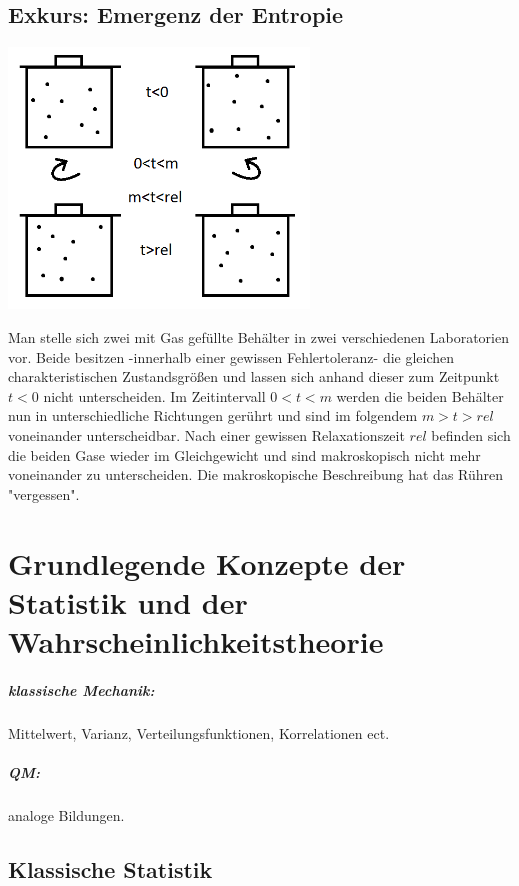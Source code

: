 	\section{Exkurs: Emergenz der Entropie}
	
	\begin{center}
		\includegraphics[width=0.6\textwidth]{Abb/Emergenz.png}
	\end{center}%
	Man stelle sich zwei mit Gas gefüllte Behälter in zwei verschiedenen Laboratorien vor. Beide besitzen -innerhalb einer gewissen Fehler\-toleranz- die gleichen charakteristischen Zustandsgrößen und lassen sich anhand dieser zum Zeitpunkt $t<0$ nicht unterscheiden. Im Zeitintervall $0<t<m$ werden die beiden Behälter nun in unterschiedliche Richtungen gerührt und sind im folgendem $m>t>rel$ voneinander unterscheidbar. Nach einer gewissen Relaxationszeit $rel$ befinden sich die beiden Gase wieder im Gleichgewicht und sind makroskopisch nicht mehr voneinander zu unterscheiden. Die makroskopische Beschreibung hat das Rühren "vergessen". 

	
\chapter{Grundlegende Konzepte der Statistik und der Wahrscheinlichkeitstheorie}

	\paragraph{klassische Mechanik:}
		Mittelwert, Varianz, Verteilungsfunktionen, Korrelationen ect.
	\paragraph{QM:}
		analoge Bildungen.
		
	\section{Klassische Statistik}
	
